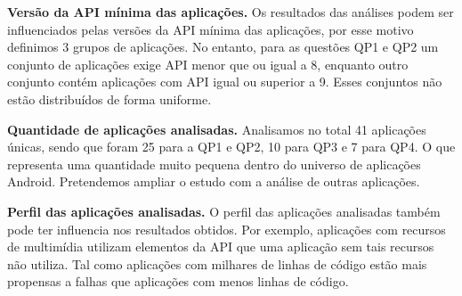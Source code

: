 \textbf{Versão da API mínima das aplicações.} Os resultados das análises podem ser
influenciados pelas versões da API mínima das aplicações, por esse motivo definimos
3 grupos de aplicações. No entanto, para as questões QP1 e QP2 um conjunto de aplicações
exige API menor que ou igual a 8, enquanto outro conjunto contém aplicações com API igual
ou superior a 9. Esses conjuntos não estão distribuídos de forma uniforme.

\textbf{Quantidade de aplicações analisadas.} Analisamos no total 41 aplicações únicas,
sendo que foram 25 para a QP1 e QP2, 10 para QP3 e 7 para QP4. O que representa uma
quantidade muito pequena dentro do universo de aplicações Android. Pretendemos ampliar
o estudo com a análise de outras aplicações.

\textbf{Perfil das aplicações analisadas.} O perfil das aplicações analisadas também
pode ter influencia nos resultados obtidos. Por exemplo, aplicações com recursos de
multimídia utilizam elementos da API que uma aplicação sem tais recursos não utiliza.
Tal como aplicações com milhares de linhas de código estão mais propensas a falhas
que aplicações com menos linhas de código.

